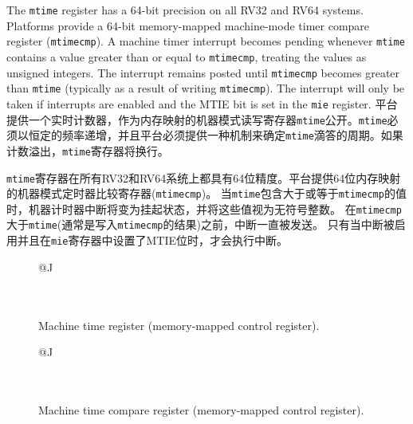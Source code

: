 {The {\tt mtime} register has a 64-bit precision on all RV32 and RV64
systems.  Platforms provide a 64-bit memory-mapped machine-mode
timer compare register ({\tt mtimecmp}).
A machine timer interrupt becomes pending whenever {\tt mtime} contains
a value greater than or equal to {\tt mtimecmp}, treating the values
as unsigned integers.
The interrupt remains posted until {\tt mtimecmp} becomes greater than
{\tt mtime} (typically as a result of writing {\tt mtimecmp}).
The interrupt will only be taken if interrupts
are enabled and the MTIE bit is set in the {\tt mie} register.
\fi
平台提供一个实时计数器，作为内存映射的机器模式读写寄存器{\tt mtime}公开。{\tt mtime}必须以恒定的频率递增，并且平台必须提供一种机制来确定{\tt mtime}滴答的周期。如果计数溢出，{\tt mtime}寄存器将换行。

{\tt mtime}寄存器在所有RV32和RV64系统上都具有64位精度。平台提供64位内存映射的机器模式定时器比较寄存器({\tt mtimecmp})。
当{\tt mtime}包含大于或等于{\tt mtimecmp}的值时，机器计时器中断将变为挂起状态，并将这些值视为无符号整数。
在{\tt mtimecmp}大于{\tt mtime}(通常是写入{\tt mtimecmp}的结果)之前，中断一直被发送。
只有当中断被启用并且在{\tt mie}寄存器中设置了MTIE位时，才会执行中断。

\begin{figure}[h!]
	{\footnotesize
		\begin{center}
			\begin{tabular}{@{}J}
				 \\
				\hline
				 \\
				 \\
			\end{tabular}
		\end{center}
	}
	\vspace{-0.1in}
	\caption{Machine time register (memory-mapped control register).}
\end{figure}

\begin{figure}[h!]
	{\footnotesize
		\begin{center}
			\begin{tabular}{@{}J}
				\instbitrange{63}{0} \\
				\hline
				\multicolumn{1}{|c|}{\tt mtimecmp} \\
				\hline
				64 \\
			\end{tabular}
		\end{center}
	}
	\vspace{-0.1in}
	\caption{Machine time compare register (memory-mapped control register).}
\end{figure}

}
